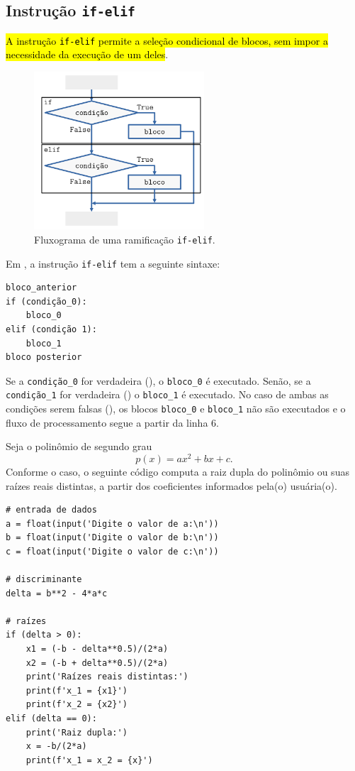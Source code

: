 \subsection{Instrução \texttt{if-elif}}

\hl{A instrução \texttt{if-elif} permite a seleção condicional de blocos, sem impor a necessidade da execução de um deles}.

\begin{figure}[H]
  \centering
  \includegraphics[width=2.5in]{./cap_progest/dados/fig_fg_elif/fig.png}
  \caption{Fluxograma de uma ramificação \lstinline+if-elif+.}
  \label{cap_progest_sec_ramifica:fig:fg_elif}
\end{figure}

Em {\python}, a instrução \lstinline+if-elif+ tem a seguinte sintaxe:

\begin{lstlisting}
bloco_anterior
if (condição_0):
    bloco_0
elif (condição 1):
    bloco_1
bloco posterior
\end{lstlisting}

Se a \lstinline+condição_0+ for verdadeira ({\PYTHONTrue}), o \lstinline+bloco_0+ é executado. Senão, se a \lstinline+condição_1+ for verdadeira ({\PYTHONTrue}) o \lstinline+bloco_1+ é executado. No caso de ambas as condições serem falsas ({\PYTHONFalse}), os blocos \lstinline+bloco_0+ e \lstinline+bloco_1+ não são executados e o fluxo de processamento segue a partir da linha 6.

\begin{ex}
  Seja o polinômio de segundo grau
  \begin{equation}
    p(x) = ax^2 + bx + c.
  \end{equation}
  Conforme o caso, o seguinte código computa a raiz dupla do polinômio ou suas raízes reais distintas, a partir dos coeficientes informados pela(o) usuária(o).

\begin{lstlisting}
# entrada de dados
a = float(input('Digite o valor de a:\n'))
b = float(input('Digite o valor de b:\n'))
c = float(input('Digite o valor de c:\n'))

# discriminante
delta = b**2 - 4*a*c

# raízes
if (delta > 0):
    x1 = (-b - delta**0.5)/(2*a)
    x2 = (-b + delta**0.5)/(2*a)
    print('Raízes reais distintas:')
    print(f'x_1 = {x1}')
    print(f'x_2 = {x2}')
elif (delta == 0):
    print('Raiz dupla:')
    x = -b/(2*a)
    print(f'x_1 = x_2 = {x}')
\end{lstlisting}

\end{ex}

